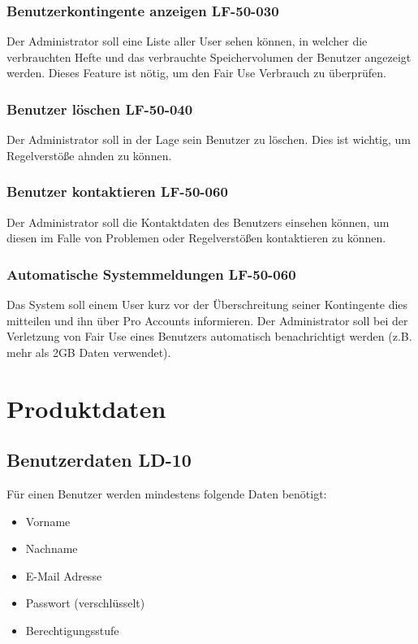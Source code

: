 \documentclass[12pt,a4paper,oneside,ngerman]{scrartcl}
\begin{document}
\subsubsection{Benutzerkontingente anzeigen \hfill LF-50-030}
Der Administrator soll eine Liste aller User sehen können, in welcher die verbrauchten Hefte und das verbrauchte Speichervolumen der Benutzer angezeigt werden. Dieses Feature ist nötig, um den Fair Use Verbrauch zu überprüfen.

\subsubsection{Benutzer löschen \hfill LF-50-040}
Der Administrator soll in der Lage sein Benutzer zu löschen. Dies ist wichtig, um Regelverstöße ahnden zu können.

\subsubsection{Benutzer kontaktieren \hfill LF-50-060}
Der Administrator soll die Kontaktdaten des Benutzers einsehen können, um diesen im Falle von Problemen oder Regelverstößen kontaktieren zu können.

\subsubsection{Automatische Systemmeldungen \hfill LF-50-060}
Das System soll einem User kurz vor der Überschreitung seiner Kontingente dies mitteilen und ihn über Pro Accounts informieren. Der Administrator soll bei der Verletzung von Fair Use eines Benutzers automatisch benachrichtigt werden (z.B. mehr als 2GB Daten verwendet).


\section{Produktdaten}
\subsection[Benutzerdaten]{Benutzerdaten \hfill LD-10}
Für einen Benutzer werden mindestens folgende Daten benötigt:
\begin{itemize}
\item Vorname
\item Nachname
\item E-Mail Adresse
\item Passwort (verschlüsselt)
\item Berechtigungsstufe
\end{itemize}
\end{document}

